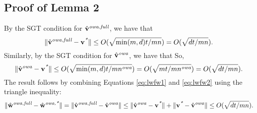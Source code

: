 \documentclass[thesis.tex]{subfiles}
\newcommand{\nowa}{n^{\textit{owa}}}
\begin{document}

\subsection*{Proof of Lemma 2}
    By the SGT condition for $\hat{\mathbf{v}}^{\textit{owa,full}}$, we have that
    \begin{equation}
        \label{eq:lwfw1}
        {\lVert {\hat{\mathbf{v}}^{\textit{owa,full}}-\mathbf{v}^{\textit{*}}} \rVert} \le O(\sqrt{\min(m,d)t/mn}) = O(\sqrt{dt/mn}).
    \end{equation}
    Similarly, by the SGT condition for $\hat{\mathbf{v}}^{\textit{owa}}$, we have that
    So,
    \begin{equation}
        \label{eq:lwfw2}
        \ltwo{\vowa-\vstar} \le O(\sqrt{\min(m,d)t/m\nowa}) = O(\sqrt{mt/m\nowa}) = O(\sqrt{dt/mn}).
    \end{equation}
    The result follows by combining Equations \ref{eq:lwfw1} and \ref{eq:lwfw2} using the triangle inequality:
    \begin{equation}
        {\lVert {\hat{\mathbf w}^{\textit{owa,full}}-\hat{\mathbf w}^{\textit{owa,*}}} \rVert} = {\lVert {\hat{\mathbf{v}}^{\textit{owa,full}}-\hat{\mathbf{v}}^{\textit{owa}}} \rVert} \le {\lVert {\hat{\mathbf{v}}^{\textit{owa}}-\mathbf{v}^{\textit{*}}} \rVert} + {\lVert {\mathbf{v}^{\textit{*}}-\hat{\mathbf{v}}^{\textit{owa}}} \rVert} 
        \le O(\sqrt{dt/mn})
        .
    \end{equation}

\end{document}
